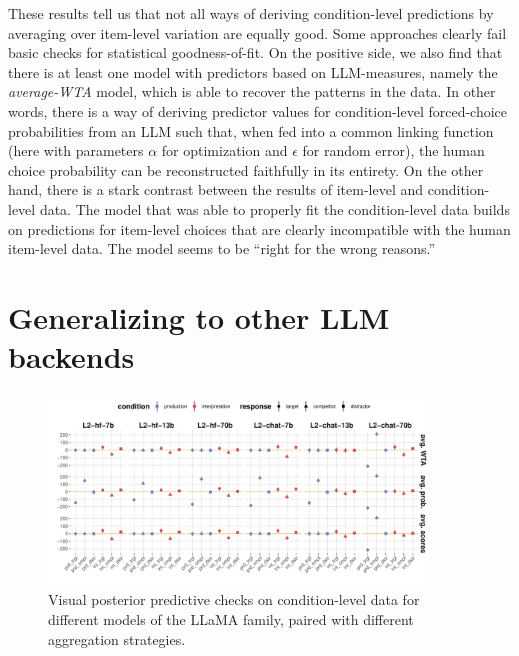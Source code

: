 \documentclass[fleqn]{article}
\begin{document}
These results tell us that not all ways of deriving condition-level predictions by averaging over item-level variation are equally good.
Some approaches clearly fail basic checks for statistical goodness-of-fit.
On the positive side, we also find that there is at least one model with predictors based on LLM-measures, namely the \emph{average-WTA} model, which is able to recover the patterns in the data.
In other words, there is a way of deriving predictor values for condition-level forced-choice probabilities from an LLM such that, when fed into a common linking function (here with parameters $\alpha$ for optimization and $\epsilon$ for random error), the human choice probability can be reconstructed faithfully in its entirety.
On the other hand, there is a stark contrast between the results of item-level and condition-level data.
The model that was able to properly fit the condition-level data builds on predictions for item-level choices that are clearly incompatible with the human item-level data.
The model seems to be ``right for the wrong reasons.''

\section{Generalizing to other LLM backends}
\label{sec:gener-other-llm}

\begin{figure}[t]
  \centering
  \includegraphics[width=0.9\textwidth]{00-pics/vPPC_all_LLaMA_models.pdf}
  \caption{Visual posterior predictive checks on condition-level data for different models of the LLaMA family, paired with different aggregation strategies.}
  \label{fig:LLaMA-results-vPPC}
\end{figure}
\end{document}
